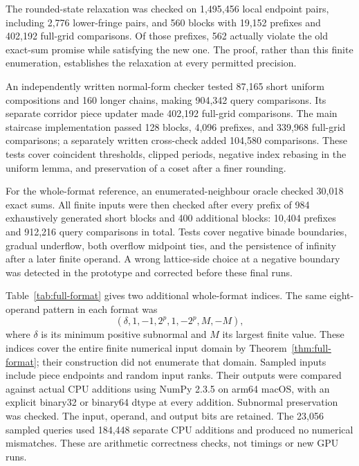 \documentclass[11pt,reqno]{amsart}
\theoremstyle{definition}
\theoremstyle{remark}
\numberwithin{equation}{section}
\begin{document}
The rounded-state relaxation was checked on 1,495,456 local endpoint
pairs, including 2,776 lower-fringe pairs, and 560 blocks with 19,152
prefixes and 402,192 full-grid comparisons. Of those prefixes, 562
actually violate the old exact-sum promise while satisfying the new one.
The proof, rather than this finite enumeration, establishes the relaxation
at every permitted precision.

An independently written normal-form checker tested 87,165 short uniform
compositions and 160 longer chains, making 904,342 query comparisons.
Its separate corridor piece updater made 402,192 full-grid comparisons.
The main staircase implementation passed 128 blocks, 4,096 prefixes,
and 339,968 full-grid comparisons; a separately written cross-check added
104,580 comparisons. These tests cover coincident thresholds, clipped
periods, negative index rebasing in the uniform lemma, and preservation
of a coset after a finer rounding.

For the whole-format reference, an enumerated-neighbour oracle checked
30,018 exact sums. All finite inputs were then checked after every prefix
of 984 exhaustively generated short blocks and 400 additional blocks:
10,404 prefixes and 912,216 query comparisons in total. Tests cover
negative binade boundaries, gradual underflow, both overflow midpoint
ties, and the persistence of infinity after a later finite operand.
A wrong lattice-side choice at a negative boundary was detected in the
prototype and corrected before these final runs.

Table~\ref{tab:full-format} gives two additional whole-format indices.
The same eight-operand pattern in each format was
\[
 (\delta,1,-1,2^p,1,-2^p,M,-M),
\]
where $\delta$ is its minimum positive subnormal and $M$ its largest
finite value. These indices cover the entire finite numerical input
domain by Theorem~\ref{thm:full-format}; their construction did not
enumerate that domain. Sampled inputs include piece endpoints and random
input ranks. Their outputs were compared against actual CPU additions
using NumPy 2.3.5 on arm64 macOS, with an explicit binary32 or binary64
dtype at every addition. Subnormal preservation was checked. The input,
operand, and output bits are retained. The 23,056 sampled queries used
184,448 separate CPU additions and produced no numerical mismatches.
These are arithmetic correctness checks, not timings or new GPU runs.
\end{document}
